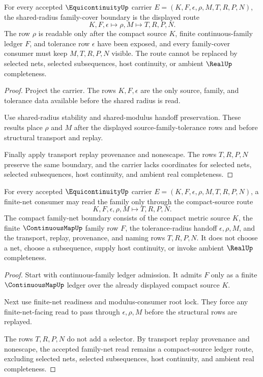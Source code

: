 \begin{theorem}
\label{thm:equicontinuity-shared-radius-family-cover-readiness}
For every accepted $\EquicontinuityUp$ carrier $E=(K,F,\epsilon,\rho,M,T,R,P,N)$, the shared-radius family-cover boundary is the displayed route
$$
K,F,\epsilon \longmapsto \rho,M \longmapsto T,R,P,N .
$$
The row $\rho$ is readable only after the compact source $K$, finite continuous-family ledger $F$, and tolerance row $\epsilon$ have been exposed, and every family-cover consumer must keep $M,T,R,P,N$ visible. The route cannot be replaced by selected nets, selected subsequences, host continuity, or ambient $\RealUp$ completeness.
\end{theorem}
\begin{proof}
Project the carrier. The rows $K,F,\epsilon$ are the only source, family, and tolerance data available before the shared radius is read.

Use shared-radius stability and shared-modulus handoff preservation. These results place $\rho$ and $M$ after the displayed source-family-tolerance rows and before structural transport and replay.

Finally apply transport replay provenance and nonescape. The rows $T,R,P,N$ preserve the same boundary, and the carrier lacks coordinates for selected nets, selected subsequences, host continuity, and ambient real completeness.
\end{proof}

\begin{theorem}
\label{thm:equicontinuity-compact-family-net-readiness}
For every accepted $\EquicontinuityUp$ carrier $E=(K,F,\epsilon,\rho,M,T,R,P,N)$, a finite-net consumer may read the family only through the compact-source route
$$
K,F,\epsilon,\rho,M \longmapsto T,R,P,N .
$$
The compact family-net boundary consists of the compact metric source $K$, the finite $\ContinuousMapUp$ family row $F$, the tolerance-radius handoff $\epsilon,\rho,M$, and the transport, replay, provenance, and naming rows $T,R,P,N$. It does not choose a net, choose a subsequence, supply host continuity, or invoke ambient $\RealUp$ completeness.
\end{theorem}
\begin{proof}
Start with continuous-family ledger admission. It admits $F$ only as a finite $\ContinuousMapUp$ ledger over the already displayed compact source $K$.

Next use finite-net readiness and modulus-consumer root lock. They force any finite-net-facing read to pass through $\epsilon,\rho,M$ before the structural rows are replayed.

The rows $T,R,P,N$ do not add a selector. By transport replay provenance and nonescape, the accepted family-net read remains a compact-source ledger route, excluding selected nets, selected subsequences, host continuity, and ambient real completeness.
\end{proof}

